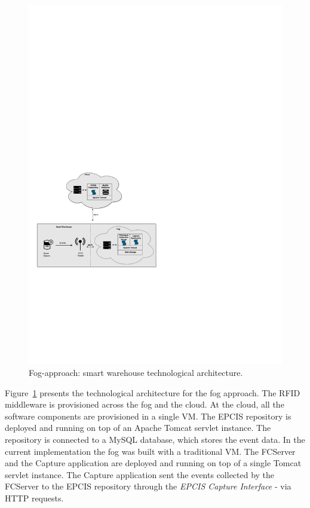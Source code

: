 \begin{figure}
  \centering
  \includegraphics[width=\textwidth]{./images/implementation_fog_architecture}
  \caption{Fog-approach: smart warehouse technological architecture.}
  \label{fig:implementation_fog_architecture}
\end{figure}

Figure~\ref{fig:implementation_fog_architecture} presents the technological architecture for the fog
approach. The \gls{RFID} middleware is provisioned across the fog and the cloud. At the cloud,
all the software components are provisioned in a single \gls{VM}. The \gls{EPCIS} repository is deployed
and running on top of an Apache Tomcat servlet instance. The repository is connected to a MySQL
database, which stores the event data. In the current implementation the fog was built with a traditional
\gls{VM}. The \gls{FCServer} and the Capture application are deployed and running on top of a single
Tomcat servlet instance. The Capture application sent the events collected by the \gls{FCServer} to
the \gls{EPCIS} repository through the \textit{\gls{EPCIS} Capture Interface} - via \gls{HTTP} requests.\\

